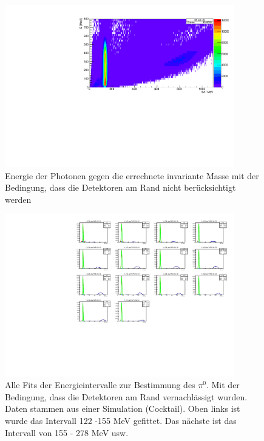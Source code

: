 \documentclass[a4paper,11pt,oneside,final,german,openbib,pdftex]{scrbook}
\begin{document}
\begin{appendix}
\begin{figure}[h!]
	\begin{center}
		\includegraphics[width=100mm]{30DegreeEdge1403}
		\caption{Energie der Photonen gegen die errechnete invariante Masse mit der Bedingung, dass die Detektoren am Rand nicht ber\"ucksichtigt werden}
		\label{fig:Energy-Intervall-2D-Hist-30-Edge-1403}
	\end{center}
\end{figure}

\begin{figure}
	\begin{center}
		\includegraphics[width=100mm]{30DegreeEdgeAllFits}
		\caption{Alle Fits der Energieintervalle zur Bestimmung des $\pi^0$. Mit der Bedingung, dass die Detektoren am Rand vernachl\"assigt wurden. Daten stammen aus einer Simulation (Cocktail). Oben links ist wurde das Intervall 122 -155 MeV gefittet. Das nächste ist das Intervall von 155 - 278 MeV usw.}
		\label{fig:Alle-Fits-ohne-Detektoren-am-Rand}
	\end{center}
\end{figure}


\end{appendix}
\end{document}
